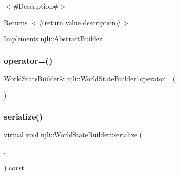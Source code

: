 $<$\#\+Description\#$>$

\begin{DoxyReturn}{Returns}
$<$\#return value description\#$>$ 
\end{DoxyReturn}


Implements \mbox{\hyperlink{classnjli_1_1_abstract_builder_a3e6e553e06d1ca30517ad5fb0bd4d000}{njli\+::\+Abstract\+Builder}}.

\mbox{\label{classnjli_1_1_world_state_builder_adbe45926b43aca70c642a3ac818c0783}} 
\subsubsection{\texorpdfstring{operator=()}{operator=()}}
{\footnotesize\ttfamily \mbox{\hyperlink{classnjli_1_1_world_state_builder}{World\+State\+Builder}}\& njli\+::\+World\+State\+Builder\+::operator= (\begin{DoxyParamCaption}\item[{const \mbox{\hyperlink{classnjli_1_1_world_state_builder}{World\+State\+Builder}} \&}]{ }\end{DoxyParamCaption})\hspace{0.3cm}{\ttfamily [protected]}}

\mbox{\label{classnjli_1_1_world_state_builder_ad4dc15a533f9829df174aacd4f7283b2}} 
\subsubsection{\texorpdfstring{serialize()}{serialize()}}
{\footnotesize\ttfamily virtual \mbox{\hyperlink{_thread_8h_af1e856da2e658414cb2456cb6f7ebc66}{void}} njli\+::\+World\+State\+Builder\+::serialize (\begin{DoxyParamCaption}\item[{\mbox{\hyperlink{_thread_8h_af1e856da2e658414cb2456cb6f7ebc66}{void}} $\ast$}]{,  }\item[{bt\+Serializer $\ast$}]{ }\end{DoxyParamCaption}) const\hspace{0.3cm}{\ttfamily [virtual]}}

